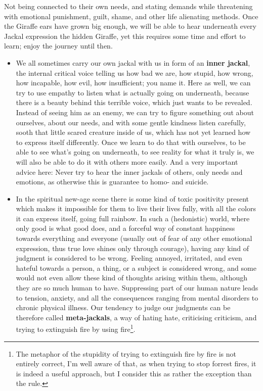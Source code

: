 \begin{itemize}
    Not being connected to their own needs, and stating demands while threatening with emotional punishment, guilt, shame, and other life alienating methods.
    Once the Giraffe ears have grown big enough, we will be able to hear underneath every Jackal expression the hidden Giraffe, yet this requires some time and effort to learn; enjoy the journey until then.
    \begin{itemize}
        \item We all sometimes carry our own jackal with us in form of an \textbf{inner jackal}, the internal critical voice telling us how bad we are, how stupid, how wrong, how incapable, how evil, how insufficient; you name it.
        Here as well, we can try to use empathy to listen what is actually going on underneath, because there is a beauty behind this terrible voice, which just wants to be revealed.
        Instead of seeing him as an enemy, we can try to figure something out about ourselves, about our needs, and with some gentle kindness listen carefully, sooth that little scared creature inside of us, which has not yet learned how to express itself differently.
        Once we learn to do that with ourselves, to be able to see what's going on underneath, to see reality for what it truly is, we will also be able to do it with others more easily.
        And a very important advice here: Never try to hear the inner jackals of others, only needs and emotions, as otherwise this is guarantee to homo- and suicide.
        \item In the spiritual new-age scene there is some kind of toxic positivity present which makes it impossible for them to live their lives fully, with all the colors it can express itself, going full rainbow.
        In such a (hedonistic) world, where only good is what good does, and a forceful way of constant happiness towards everything and everyone (usually out of fear of any other emotional expression, thus true love shines only through courage), having any kind of judgment is considered to be wrong.
        Feeling annoyed, irritated, and even hateful towards a person, a thing, or a subject is considered wrong, and some would not even allow these kind of thoughts arising within them, although they are so much human to have.
        Suppressing part of our human nature leads to tension, anxiety, and all the consequences ranging from mental disorders to chronic physical illness.
        Our tendency to judge our judgments can be therefore called \textbf{meta-jackals}, a way of hating hate, criticising criticism, and trying to extinguish fire by using fire\footnote{The metaphor of the stupidity of trying to extinguish fire by fire is not entirely correct, I'm well aware of that, as when trying to stop forrest fires, it is indeed a useful approach, but I consider this as rather the exception than the rule.}.

\end{itemize}
\end{itemize}
